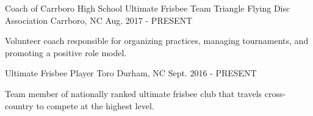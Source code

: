 

\begin{cventries}

  \cventry
    {Coach of Carrboro High School Ultimate Frisbee Team} %
    {Triangle Flying Disc Association} %
    {Carrboro, NC} %
    {Aug. 2017 - PRESENT} %
    {
      \begin{cvitems} %
        \item {Volunteer coach responsible for organizing practices, managing tournaments, and promoting a positive role model.}
      \end{cvitems}
    }

  \cventry
    {Ultimate Frisbee Player} %
    {Toro} %
    {Durham, NC} %
    {Sept. 2016 - PRESENT} %
    {
      \begin{cvitems} %
        \item {Team member of nationally ranked ultimate frisbee club that travels cross-country to compete at the highest level.}
      \end{cvitems}
    }

\end{cventries}
